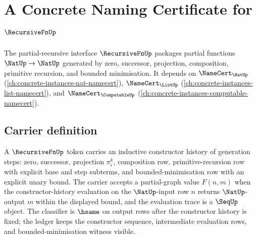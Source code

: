 \chapter{A Concrete Naming Certificate for $\RecursiveFnUp$}
\label{ch:concrete-instances-recursivefn-namecert}

The partial-recursive interface $\RecursiveFnUp$ packages partial functions $\NatUp \to \NatUp$ generated by zero, successor, projection, composition, primitive recursion, and bounded minimisation. It depends on $\NameCert_{\NatUp}$ (\autoref{ch:concrete-instances-nat-namecert}), $\NameCert_{\ListUp}$ (\autoref{ch:concrete-instances-list-namecert}), and $\NameCert_{\ComputableUp}$ (\autoref{ch:concrete-instances-computable-namecert}).

\section{Carrier definition}
\label{sec:recursivefn-carrier}

A $\RecursiveFnUp$ token carries an inductive constructor history of generation steps: zero, successor, projection $\pi^k_i$, composition row, primitive-recursion row with explicit base and step subterms, and bounded-minimisation row with an explicit unary bound. The carrier accepts a partial-graph value $F(n,m)$ when the constructor-history evaluation on the $\NatUp$-input row $n$ returns $\NatUp$-output $m$ within the displayed bound, and the evaluation trace is a $\SeqUp$ object. The classifier is $\hsame$ on output rows after the constructor history is fixed; the ledger keeps the constructor sequence, intermediate evaluation rows, and bounded-minimisation witness visible.

